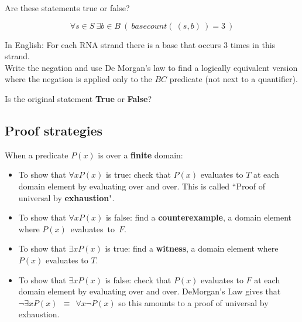 \documentclass[12pt, oneside]{article}
\begin{document}
\vfill

Are these statements true or false?

\newpage

$$\forall s \in S ~\exists b\in B ~(~basecount(~(s,b)~) = 3~)$$

In English: For each RNA strand there is a base that occurs 3 times in this strand.\\

Write the negation and use De Morgan's law to find a 
logically equivalent version where the negation is applied only to the 
$BC$ predicate (not next to a quantifier).

\vspace{60pt}


Is the original statement {\bf True} or {\bf False}?

\vfill
 \subsection*{Proof strategies}


When a predicate $P(x)$ is over a {\bf finite} domain:
\begin{itemize}
\item To show that $\forall x  P(x)$ is true: check that $P(x)$ evaluates to $T$ at each domain element by evaluating over and over. 
This is called ``Proof of universal by {\bf exhaustion}".
\item To show that $\forall x  P(x)$ is false: find a {\bf counterexample}, a domain element where $P(x)$~evaluates~to~$F$.
\item To show that $\exists x  P(x)$ is true: find a {\bf witness}, a domain element where $P(x)$ evaluates to $T$.
\item To show that $\exists x  P(x)$ is false: check that $P(x)$ evaluates to $F$ at each domain element by evaluating over and over.
DeMorgan's Law gives that $\lnot \exists x P(x) ~~\equiv~~ \forall x \lnot P(x)$ so this amounts to a proof of universal by exhaustion.
\end{itemize} 

 \vfill
\newpage
\end{document}
